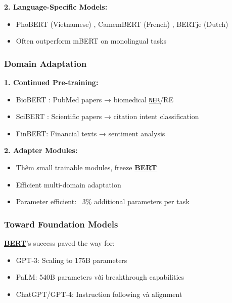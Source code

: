 \textbf{2. Language-Specific Models:}
\begin{itemize}
    \item PhoBERT (Vietnamese) \cite{nguyen2020phobert}, CamemBERT (French) \cite{martin2019camembert}, BERTje (Dutch)
    \item Often outperform mBERT on monolingual tasks
\end{itemize}

\subsubsection{Domain Adaptation}

\textbf{1. Continued Pre-training:}
\begin{itemize}
    \item BioBERT \cite{lee2020biobert}: PubMed papers → biomedical \hyperref[acro:ner]{\texttt{NER}}/RE
    \item SciBERT \cite{beltagy2019scibert}: Scientific papers → citation intent classification
    \item FinBERT: Financial texts → sentiment analysis
\end{itemize}

\textbf{2. Adapter Modules:}
\begin{itemize}
    \item Thêm small trainable modules, freeze \hyperref[acro:bert]{\textbf{BERT}}
    \item Efficient multi-domain adaptation
    \item Parameter efficient: ~3\% additional parameters per task
\end{itemize}

\subsubsection{Toward Foundation Models}
\hyperref[acro:bert]{\textbf{BERT}}'s success paved the way for:
\begin{itemize}
    \item GPT-3: Scaling to 175B parameters
    \item PaLM: 540B parameters với breakthrough capabilities
    \item ChatGPT/GPT-4: Instruction following và alignment
\end{itemize}

